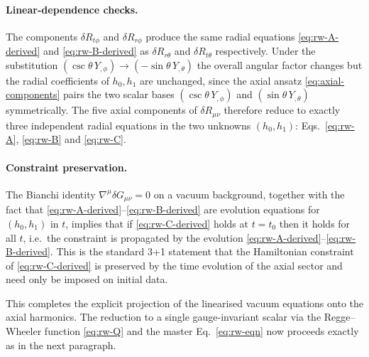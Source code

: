 \paragraph{Linear-dependence checks.}
The components $\delta R_{t\phi}$ and $\delta R_{r\phi}$ produce
the same radial equations \eqref{eq:rw-A-derived} and
\eqref{eq:rw-B-derived} as $\delta R_{r\theta}$ and
$\delta R_{t\theta}$ respectively. Under the substitution
$(\csc\theta\,Y_{,\phi})\to(-\sin\theta\,Y_{,\theta})$ the
overall angular factor changes but the radial coefficients of
$h_{0},h_{1}$ are unchanged, since the axial ansatz
\eqref{eq:axial-components} pairs the two scalar bases
$(\csc\theta\,Y_{,\phi})$ and $(\sin\theta\,Y_{,\theta})$
symmetrically. The five axial components of $\delta R_{\mu\nu}$
therefore reduce to exactly three independent radial equations
in the two unknowns $(h_{0},h_{1})$: Eqs.~\eqref{eq:rw-A},
\eqref{eq:rw-B} and \eqref{eq:rw-C}.

\paragraph{Constraint preservation.}
The Bianchi identity $\nabla^{\mu}\delta G_{\mu\nu}=0$ on a
vacuum background, together with the fact that
\eqref{eq:rw-A-derived}--\eqref{eq:rw-B-derived} are evolution
equations for $(h_{0},h_{1})$ in $t$, implies that if
\eqref{eq:rw-C-derived} holds at $t=t_{0}$ then it holds for all
$t$, i.e.\ the constraint is propagated by the evolution
\eqref{eq:rw-A-derived}--\eqref{eq:rw-B-derived}. This is the
standard 3+1 statement that the Hamiltonian constraint of
\eqref{eq:rw-C-derived} is preserved by the time evolution of
the axial sector and need only be imposed on initial data.

This completes the explicit projection of the linearised vacuum
equations onto the axial harmonics. The reduction to a single
gauge-invariant scalar via the Regge--Wheeler function
\eqref{eq:rw-Q} and the master Eq.~\eqref{eq:rw-eqn} now
proceeds exactly as in the next paragraph.
